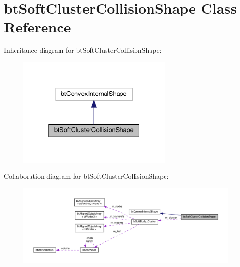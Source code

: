 \hypertarget{classbtSoftClusterCollisionShape}{}\section{bt\+Soft\+Cluster\+Collision\+Shape Class Reference}
\label{classbtSoftClusterCollisionShape}


Inheritance diagram for bt\+Soft\+Cluster\+Collision\+Shape\+:
\nopagebreak
\begin{figure}[H]
\begin{center}
\leavevmode
\includegraphics[width=220pt]{classbtSoftClusterCollisionShape__inherit__graph}
\end{center}
\end{figure}


Collaboration diagram for bt\+Soft\+Cluster\+Collision\+Shape\+:
\nopagebreak
\begin{figure}[H]
\begin{center}
\leavevmode
\includegraphics[width=350pt]{classbtSoftClusterCollisionShape__coll__graph}
\end{center}
\end{figure}
